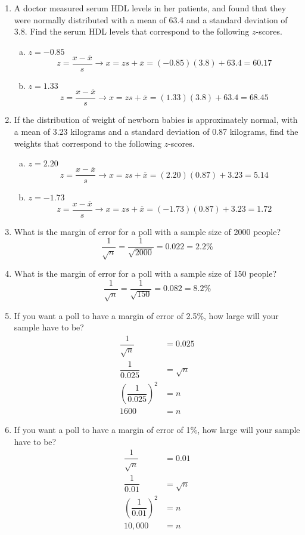 \begin{enumerate}
\item A doctor measured serum HDL levels in her patients, and found that they were normally distributed with a mean of 63.4 and a standard deviation of 3.8.  Find the serum HDL levels that correspond to the following $z$-scores.
\begin{enumerate}[(a)]
\item $z=-0.85$ 
\[z = \dfrac{x - \overline{x}}{s} \longrightarrow x = zs + \overline{x} = (-0.85)(3.8) + 63.4 = 60.17\]
\item $z=1.33$ 
\[z = \dfrac{x - \overline{x}}{s} \longrightarrow x = zs + \overline{x} = (1.33)(3.8) + 63.4 = 68.45\]
\end{enumerate}

\item If the distribution of weight of newborn babies is approximately normal, with a mean of 3.23 kilograms and a standard deviation of 0.87 kilograms, find the weights that correspond to the following $z$-scores.
\begin{enumerate}[(a)]
\item $z=2.20$ 
\[z = \dfrac{x - \overline{x}}{s} \longrightarrow x = zs + \overline{x} = (2.20)(0.87) + 3.23 = 5.14\]
\item $z=-1.73$ 
\[z = \dfrac{x - \overline{x}}{s} \longrightarrow x = zs + \overline{x} = (-1.73)(0.87) + 3.23 = 1.72\]
\end{enumerate}

\item What is the margin of error for a poll with a sample size of 2000 people? 
\[\dfrac{1}{\sqrt{n}} = \dfrac{1}{\sqrt{2000}} = 0.022 = 2.2\%\]

\item What is the margin of error for a poll with a sample size of 150 people? 
\[\dfrac{1}{\sqrt{n}} = \dfrac{1}{\sqrt{150}} = 0.082 = 8.2\%\]

\item If you want a poll to have a margin of error of 2.5\%, how large will your sample have to be? 
\begin{align*}
\dfrac{1}{\sqrt{n}} &= 0.025\\
\dfrac{1}{0.025} &= \sqrt{n}\\
\left(\dfrac{1}{0.025}\right)^2 &= n\\
1600 &= n
\end{align*}

\item If you want a poll to have a margin of error of 1\%, how large will your sample have to be? 
\begin{align*}
\dfrac{1}{\sqrt{n}} &= 0.01\\
\dfrac{1}{0.01} &= \sqrt{n}\\
\left(\dfrac{1}{0.01}\right)^2 &= n\\
10,000 &= n
\end{align*}
\end{enumerate}